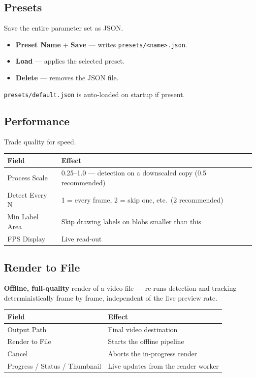 \documentclass[11pt,a4paper,openany]{report}
\begin{document}
\subsection{Presets}
Save the entire parameter set as JSON.

\begin{itemize}
    \item \textbf{Preset Name} + \textbf{Save} --- writes
        \texttt{presets/<name>.json}.
    \item \textbf{Load} --- applies the selected preset.
    \item \textbf{Delete} --- removes the JSON file.
\end{itemize}

\texttt{presets/default.json} is auto-loaded on startup if present.

\subsection{Performance}
Trade quality for speed.

\begin{tabularx}{\linewidth}{@{}lX@{}}
    \toprule
    \textbf{Field} & \textbf{Effect} \\
    \midrule
    Process Scale  & 0.25--1.0 --- detection on a downscaled copy (0.5 recommended) \\
    Detect Every N & 1 = every frame, 2 = skip one, etc.\ (2 recommended) \\
    Min Label Area & Skip drawing labels on blobs smaller than this \\
    FPS Display    & Live read-out \\
    \bottomrule
\end{tabularx}

\subsection{Render to File}
\textbf{Offline, full-quality} render of a video file --- re-runs detection
and tracking deterministically frame by frame, independent of the live
preview rate.

\begin{tabularx}{\linewidth}{@{}lX@{}}
    \toprule
    \textbf{Field} & \textbf{Effect} \\
    \midrule
    Output Path     & Final video destination \\
    Render to File  & Starts the offline pipeline \\
    Cancel          & Aborts the in-progress render \\
    Progress / Status / Thumbnail & Live updates from the render worker \\
    \bottomrule
\end{tabularx}
\end{document}
